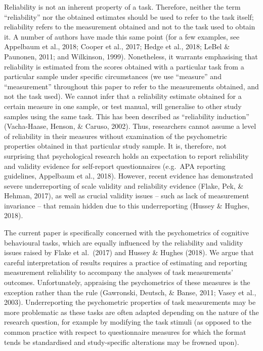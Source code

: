 \documentclass[english,,man,floatsintext]{apa6}
\begin{document}
Reliability is not an inherent property of a task. Therefore, neither the term \enquote{reliability} nor the obtained estimates should be used to refer to the task itself; reliability refers to the measurement obtained and not to the task used to obtain it. A number of authors have made this same point (for a few examples, see Appelbaum et al., 2018; Cooper et al., 2017; Hedge et al., 2018; LeBel \& Paunonen, 2011; and Wilkinson, 1999). Nonetheless, it warrants emphasising that reliability is estimated from the scores obtained with a particular task from a particular sample under specific circumstances (we use \enquote{measure} and \enquote{measurement} throughout this paper to refer to the measurements obtained, and not the task used). We cannot infer that a reliability estimate obtained for a certain measure in one sample, or test manual, will generalise to other study samples using the same task. This has been described as \enquote{reliability induction} (Vacha-Haase, Henson, \& Caruso, 2002). Thus, researchers cannot assume a level of reliability in their measures without examination of the psychometric properties obtained in that particular study sample. It is, therefore, not surprising that psychological research holds an expectation to report reliability and validity evidence for self-report questionnaires (e.g.~APA reporting guidelines, Appelbaum et al., 2018). However, recent evidence has demonstrated severe underreporting of scale validity and reliability evidence (Flake, Pek, \& Hehman, 2017), as well as crucial validity issues -- such as lack of measurement invariance -- that remain hidden due to this underreporting (Hussey \& Hughes, 2018).

The current paper is specifically concerned with the psychometrics of cognitive behavioural tasks, which are equally influenced by the reliability and validity issues raised by Flake et al.~(2017) and Hussey \& Hughes (2018). We argue that careful interpretation of results requires a practice of estimating and reporting measurement reliability to accompany the analyses of task measurements' outcomes. Unfortunately, appraising the psychometrics of these measures is the exception rather than the rule (Gawronski, Deutsch, \& Banse, 2011; Vasey et al., 2003). Underreporting the psychometric properties of task measurements may be more problematic as these tasks are often adapted depending on the nature of the research question, for example by modifying the task stimuli (as opposed to the common practice with respect to questionnaire measures for which the format tends be standardised and study-specific alterations may be frowned upon).
\end{document}
